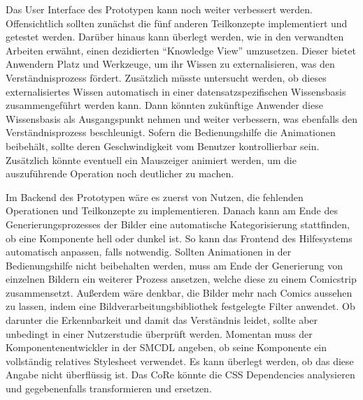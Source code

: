 \documentclass[
	headsepline,
	footsepline,
	fontsize=12pt,
	bibliography=totoc
]{scrbook}
\begin{document}


Das User Interface des Prototypen kann noch weiter verbessert werden. Offensichtlich sollten zunächst die fünf anderen Teilkonzepte implementiert und getestet werden. Darüber hinaus kann überlegt werden, wie in den verwandten Arbeiten erwähnt, einen dezidierten \enquote{Knowledge View} umzusetzen. Dieser bietet Anwendern Platz und Werkzeuge, um ihr Wissen zu externalisieren, was den Verständnisprozess fördert. Zusätzlich müsste untersucht werden, ob dieses externalisiertes Wissen automatisch in einer datensatzspezifischen Wissensbasis zusammengeführt werden kann. Dann könnten zukünftige Anwender diese Wissensbasis als Ausgangspunkt nehmen und weiter verbessern, was ebenfalls den Verständnisprozess beschleunigt. Sofern die Bedienungshilfe die Animationen beibehält, sollte deren Geschwindigkeit vom Benutzer kontrollierbar sein. Zusätzlich könnte eventuell ein Mauszeiger animiert werden, um die auszuführende Operation noch deutlicher zu machen.

Im Backend des Prototypen wäre es zuerst von Nutzen, die fehlenden Operationen und Teilkonzepte zu implementieren. Danach kann am Ende des Generierungsprozesses der Bilder eine automatische Kategorisierung stattfinden, ob eine Komponente hell oder dunkel ist. So kann das Frontend des Hilfesystems automatisch anpassen, falls notwendig. Sollten Animationen in der Bedienungshilfe nicht beibehalten werden, muss am Ende der Generierung von einzelnen Bildern ein weiterer Prozess ansetzen, welche diese zu einem Comicstrip zusammensetzt. Außerdem wäre denkbar, die Bilder mehr nach Comics aussehen zu lassen, indem eine Bildverarbeitungsbibliothek festgelegte Filter anwendet. Ob darunter die Erkennbarkeit und damit das Verständnis leidet, sollte aber unbedingt in einer Nutzerstudie überprüft werden. Momentan muss der Komponentenentwickler in der SMCDL angeben, ob seine Komponente ein vollständig relatives Stylesheet verwendet. Es kann überlegt werden, ob das diese Angabe nicht überflüssig ist. Das CoRe könnte die CSS Dependencies analysieren und gegebenenfalls transformieren und ersetzen.
\end{document}

